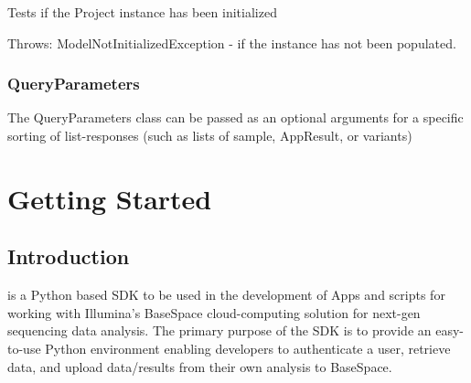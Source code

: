 \documentclass[letterpaper,10pt,english]{sphinxmanual}
\begin{document}
\begin{fulllineitems}
\begin{fulllineitems}
\end{fulllineitems}


\begin{fulllineitems}
\label{Available modules:BaseSpacePy.model.Run.Run.isInit}
Tests if the Project instance has been initialized

Throws: ModelNotInitializedException  - if the instance has not been populated.

\end{fulllineitems}


\end{fulllineitems}



\subsection{QueryParameters}
\label{Available modules:queryparameters}

\begin{fulllineitems}
\label{Available modules:BaseSpacePy.model.QueryParameters.QueryParameters}
The QueryParameters class can be passed as an optional arguments for a specific sorting of list-responses (such as lists of sample, AppResult, or variants)

\end{fulllineitems}



\chapter{Getting Started}
\label{Getting Started:getting-started}\label{Getting Started::doc}

\section{Introduction}
\label{Getting Started:introduction}
 is a Python based SDK to be used in the development of Apps and scripts for working with Illumina's BaseSpace cloud-computing solution for next-gen sequencing data analysis.
The primary purpose of the SDK is to provide an easy-to-use Python environment enabling developers to authenticate a user, retrieve data, and upload data/results from their own analysis to BaseSpace.
\end{document}
